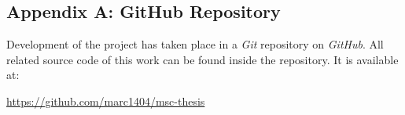 \subsection*{Appendix A: GitHub Repository}
Development of the project has taken place in a \textit{Git} repository on \textit{GitHub}.
All related source code of this work can be found inside the repository.
It is available at:

\begin{flushleft}
    \url{https://github.com/marc1404/msc-thesis}
\end{flushleft}